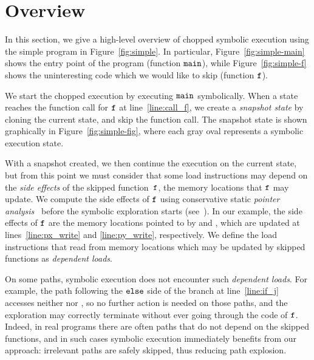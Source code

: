 
\chapter{Overview}\label{chapter:overview}

In this section, we give a high-level overview of chopped symbolic
execution using the simple program in Figure~\ref{fig:simple}. In
particular, Figure~\ref{fig:simple-main} shows the entry point of the
program (function $\texttt{main}$), while Figure~\ref{fig:simple-f}
shows the uninteresting code which we would like to skip (function
$\texttt{f}$).

We start the chopped execution by executing $\texttt{main}$
symbolically. When a state reaches the function call for $\texttt{f}$ at
line~\ref{line:call_f}, we create a \textit{snapshot state} by cloning
the current state, and skip the function call. The snapshot state is
shown graphically in Figure~\ref{fig:simple-fig}, where each gray oval
represents a symbolic execution state.

With a snapshot created, we then continue the execution on the current
state, but from this point we must consider that some load
instructions may depend on the \textit{side effects} of the skipped
function~$\texttt{f}$, \ie the memory locations that $\texttt{f}$ may
update. 
We compute the side effects of $\texttt{f}$ using conservative static
\emph{pointer analysis}~\cite{andersen:pointeranalysis, Hind:Paste2001, Smaragdakis:FTPL2015} 
before the symbolic exploration starts (see~).
In our example, the side effects of $\texttt{f}$ are the memory
locations pointed to by  and , which are updated
at lines~\ref{line:px_write} and \ref{line:py_write}, respectively.
We define the load instructions that read from memory locations 
which may be updated by skipped functions as \textit{dependent loads}.

On some paths, symbolic execution does not encounter such
\textit{dependent loads}. For example, the path following the
$\texttt{else}$ side of the branch at line~\ref{line:if_j} accesses
neither  nor , so no further action is needed on
those paths, and the exploration may correctly terminate without ever
going through the code of $\texttt{f}$. Indeed, in real programs there
are often paths that do not depend on the skipped functions, and in
such cases symbolic execution immediately benefits from our approach:
irrelevant paths are safely skipped, thus reducing path explosion.

